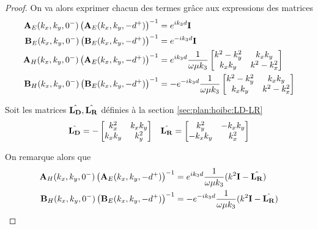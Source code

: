 \begin{proof}
            On va alors exprimer chacun des termes grâce aux expressions des matrices
            \begin{align*}
                \mathbf{A}_E(k_x,k_y,0^-)\left(\mathbf{A}_E(k_x,k_y,-d^+)\right)^{-1} &= e^{ik_3d}\mathbf{I}
                \\
                \mathbf{B}_E(k_x,k_y,0^-)\left(\mathbf{B}_E(k_x,k_y,-d^+)\right)^{-1} &= e^{-ik_3d}\mathbf{I}
                \\
                \mathbf{A}_H(k_x,k_y,0^-)\left(\mathbf{A}_E(k_x,k_y,-d^+)\right)^{-1} &= e^{ik_3d}\dfrac{1}{\omega\mu k_3}
                \begin{bmatrix}
                    k^2 - k_y^2 & k_x k_y
                    \\
                    k_x k _y & k^2 - k_x^2
                \end{bmatrix}
                \\
                \mathbf{B}_H(k_x,k_y,0^-)\left(\mathbf{B}_E(k_x,k_y,-d^+)\right)^{-1} &= -e^{-ik_3d}\dfrac{1}{\omega\mu k_3}
                    \begin{bmatrix}
                    k^2 - k_y^2 & k_x k_y
                    \\
                    k_x k _y & k^2 - k_x^2
                \end{bmatrix} 
            \end{align*}

            Soit les matrices \(\hat{\mathbf{L_D}},\hat{\mathbf{L_R}}\) définies à la section \ref{sec:plan:hoibc:LD-LR}
            \begin{align*}
                \hat{\mathbf{L_D}} = -\begin{bmatrix}
                k_x^2 & k_x k_y
                \\
                k_x k _y & k_y^2
                \end{bmatrix}
                & & 
                \hat{\mathbf{L_R}} = \begin{bmatrix}
                k_y^2 & -k_x k_y
                \\
                -k_x k _y &  k_x^2
                \end{bmatrix}
            \end{align*}

            On remarque alors que 
            \begin{align*}
                \mathbf{A}_H(k_x,k_y,0^-)\left(\mathbf{A}_E(k_x,k_y,-d^+)\right)^{-1} &=  e^{ik_3d}\dfrac{1}{\omega\mu k_3}(k^2\mathbf{I}  -\hat{\mathbf{L_R}})
                \\
                \mathbf{B}_H(k_x,k_y,0^-)\left(\mathbf{B}_E(k_x,k_y,-d^+)\right)^{-1} &= -e^{-ik_3d}\dfrac{1}{\omega\mu k_3}(k^2\mathbf{I}  -\hat{\mathbf{L_R}})
            \end{align*}


\end{proof}
